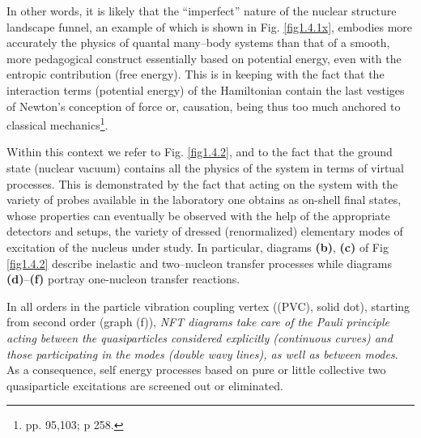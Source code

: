 In other words, it is likely that the ``imperfect'' nature of the nuclear structure landscape funnel, an example of which is shown in Fig. \ref{fig1.4.1x}, embodies more accurately the physics of quantal many--body systems than that of a smooth, more pedagogical construct essentially based on potential energy, even with the entropic contribution (free energy). This is in keeping with the fact that the interaction terms (potential energy) of the Hamiltonian contain the last vestiges of Newton's conception of force or, causation, being thus too much anchored to classical mechanics\footnote{\cite{Born:48} pp. 95,103; \cite{Pais:86} p 258.}.

Within this context we refer to Fig. \ref{fig1.4.2}, and to the fact that the ground state (nuclear vacuum)  contains   all the physics of the system in terms of virtual processes. This is demonstrated by the fact that acting on  the system with the variety of probes available in the laboratory one obtains as on-shell final states, whose properties can eventually be observed with the help of the appropriate detectors and setups, the variety of dressed (renormalized) elementary modes of excitation of the nucleus under study. In particular, diagrams \textbf{(b)}, \textbf{(c)} of Fig \ref{fig1.4.2} describe inelastic and two--nucleon transfer processes while diagrams  \textbf{(d)}--\textbf{(f)} portray  one-nucleon transfer reactions. 


In all orders in the particle vibration coupling vertex ((PVC), solid dot), starting from second order (graph (f)), \textit{NFT diagrams take care of the  Pauli principle acting between the quasiparticles considered explicitly (continuous curves) and those participating in the modes (double wavy lines), as well as between modes}. As a consequence, self energy processes based on pure or  little collective two quasiparticle excitations are  screened out or eliminated.

